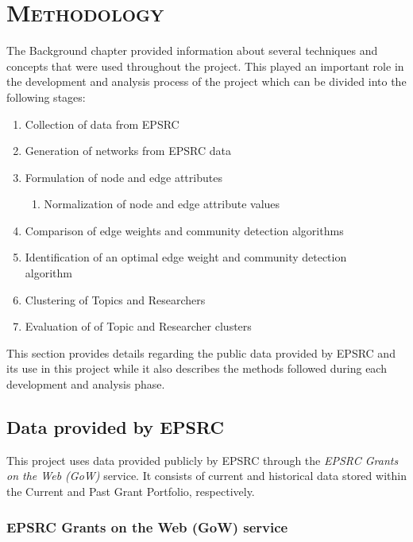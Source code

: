 \chapter{\textsc{Methodology}}
\label{chapterlabel4}

The Background chapter provided information about several techniques and concepts that were used throughout the project. This played an important role in the development and analysis process of the project which can be divided into the following stages:

\begin{enumerate}[itemsep=0cm, label*=\arabic*.]
    \item Collection of data from EPSRC
    \item Generation of networks from EPSRC data
    \item Formulation of node and edge attributes
    \begin{enumerate}[itemsep=0cm, label*=\arabic*.]
        \item Normalization of node and edge attribute values
    \end{enumerate}
    \item Comparison of edge weights and community detection algorithms
    \item Identification of an optimal edge weight and community detection\\algorithm
    \item Clustering of Topics and Researchers
    \item Evaluation of of Topic and Researcher clusters
\end{enumerate}

This section provides details regarding the public data provided by EPSRC and its use in this project while it also describes the methods followed during each development and analysis phase.

\section{Data provided by EPSRC}

This project uses data provided publicly by EPSRC through the \textit{EPSRC Grants on the Web (GoW)} service. It consists of current and historical data stored within the Current and Past Grant Portfolio, respectively.

\subsection{EPSRC Grants on the Web (GoW) service}

